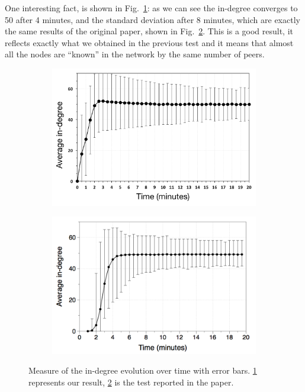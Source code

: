 \newpage
One interesting fact, is shown in Fig.~\ref{fig:indegree_evolution}: as we can see the in-degree converges to 50 after 4 minutes, and the standard deviation after 8 minutes, which are exactly the same results of the original paper, shown in Fig.~\ref{fig:paper_indegree_evolution}. This is a good result, it reflects exactly what we obtained in the previous test and it means that almost all the nodes are ``known'' in the network by the same number of peers.

\begin{figure}
\centering
\begin{subfigure}{.5\textwidth}
  \centering
  \includegraphics[keepaspectratio=true, width=1\linewidth]{images/indegree_evolution}
  \caption{}
  \label{fig:indegree_evolution}
\end{subfigure}%
\begin{subfigure}{.5\textwidth}
  \centering
  \includegraphics[keepaspectratio=true, width=1\linewidth]{images/paper_indegree_evolution}
  \caption{}
  \label{fig:paper_indegree_evolution}
\end{subfigure}
\caption{Measure of the in-degree evolution over time with error bars. \ref{fig:indegree_evolution} represents our result, \ref{fig:paper_indegree_evolution} is the test reported in the paper.}
\label{fig:randomness_indegree}
\end{figure}

